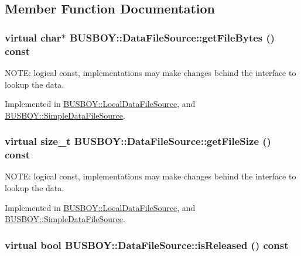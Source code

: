 \subsection{Member Function Documentation}
\hypertarget{classBUSBOY_1_1DataFileSource_ada5ea0b760f3cf5a865197d3fb9e4fcd}{
\subsubsection[{getFileBytes}]{\setlength{\rightskip}{0pt plus 5cm}virtual char$\ast$ BUSBOY::DataFileSource::getFileBytes () const}}
\label{classBUSBOY_1_1DataFileSource_ada5ea0b760f3cf5a865197d3fb9e4fcd}


NOTE: logical const, implementations may make changes behind the interface to lookup the data. 

Implemented in \hyperlink{classBUSBOY_1_1LocalDataFileSource_a15f28fad4b6a526d1a0ab341e133bbaa}{BUSBOY::LocalDataFileSource}, and \hyperlink{classBUSBOY_1_1SimpleDataFileSource_a6811ed0b59217747b60a7deffbf6f991}{BUSBOY::SimpleDataFileSource}.\hypertarget{classBUSBOY_1_1DataFileSource_a79ad2660b524ee38093b7cc72d2924f5}{
\subsubsection[{getFileSize}]{\setlength{\rightskip}{0pt plus 5cm}virtual size\_\-t BUSBOY::DataFileSource::getFileSize () const}}
\label{classBUSBOY_1_1DataFileSource_a79ad2660b524ee38093b7cc72d2924f5}


NOTE: logical const, implementations may make changes behind the interface to lookup the data. 

Implemented in \hyperlink{classBUSBOY_1_1LocalDataFileSource_a2c0ff175265c5460a699910027d3a837}{BUSBOY::LocalDataFileSource}, and \hyperlink{classBUSBOY_1_1SimpleDataFileSource_a3a88ad0f428efbe004f864d67ed642f1}{BUSBOY::SimpleDataFileSource}.\hypertarget{classBUSBOY_1_1DataFileSource_afd39ef6968c00cc9202c01d68bc87709}{
\subsubsection[{isReleased}]{\setlength{\rightskip}{0pt plus 5cm}virtual bool BUSBOY::DataFileSource::isReleased () const}}
\label{classBUSBOY_1_1DataFileSource_afd39ef6968c00cc9202c01d68bc87709}


